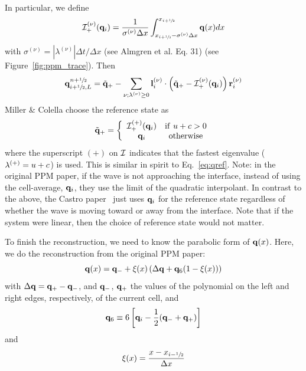 In particular, we define
\begin{equation}
{\mathcal{I}}_+^{(\nu)}({\bf q}_i) = \frac{1}{\sigma^{(\nu)} \Delta x} \int _{x_{i+{\sfrac{1}{2}}} - \sigma^{(\nu)} \Delta x}^{x_{i+{\sfrac{1}{2}}}} {\bf q}(x) dx
\end{equation}
with $\sigma^{(\nu)} = |\lambda^{(\nu)}|\Delta t / \Delta x$ (see Almgren et
al. Eq. 31)  (see Figure~\ref{fig:ppm_trace}).  Then
\begin{equation}
{\bf q}_{i+{\sfrac{1}{2}},L}^{n+{\sfrac{1}{2}}} = \tilde{{\bf q}}_+ -
   \sum_{\nu;\lambda^{(\nu)}\ge 0} {\bf l}_i^{(\nu)} \cdot \left (
        \tilde{{\bf q}}_+ - {\mathcal{I}}_+^{(\nu)}({\bf q}_i)
       \right ) {\bf r}_i^{(\nu)}  \label{eq:ppmtrace}
\end{equation}
Miller \& Colella choose the reference state as
\begin{equation}
\tilde{{\bf q}}_+ = \left \{ \begin{array}{cc}
       {\mathcal{I}}_+^{(+)}({\bf q}_i) & \mathrm{if~} u + c > 0 \\
       {\bf q}_i                    & \mathrm{otherwise}
\end{array}
\right .
\end{equation}
where the superscript $(+)$ on ${\mathcal{I}}$ indicates that the
fastest eigenvalue ($\lambda^{(+)} = u + c$) is used.  This is similar in
spirit to Eq.~\ref{eq:qref}.  Note: in the original PPM paper, if the
wave is not approaching the interface, instead of using the
cell-average, ${\bf q}_i$, they use the limit of the quadratic interpolant.
In contrast to the above, the Castro paper~\cite{almgren:2010} just
uses ${\bf q}_i$ for the reference state regardless of whether the wave is
moving toward or away from the interface.  Note that if the system
were linear, then the choice of reference state would not matter.

To finish the reconstruction, we need to know the parabolic form
of ${\bf q}(x)$.  Here, we do the reconstruction from the original PPM
paper:
\begin{equation}
{\bf q}(x) = {\bf q}_{-} + \xi(x) \left ( \Delta {\bf q} + {\bf q}_6 (1 - \xi(x) ) \right )
\end{equation}
with $\Delta {\bf q} = {\bf q}_+ - {\bf q}_-$, and ${\bf q}_-$, ${\bf q}_+$ the values of the polynomial
on the left and right edges, respectively, of the current cell, and
\begin{equation}
{\bf q}_6 \equiv 6 \left [ {\bf q}_i - \frac{1}{2} ({\bf q}_- + {\bf q}_+) \right ]
\end{equation}
and
\begin{equation}
\xi(x) = \frac{x - x_{i-{\sfrac{1}{2}}}}{\Delta x}
\end{equation}

